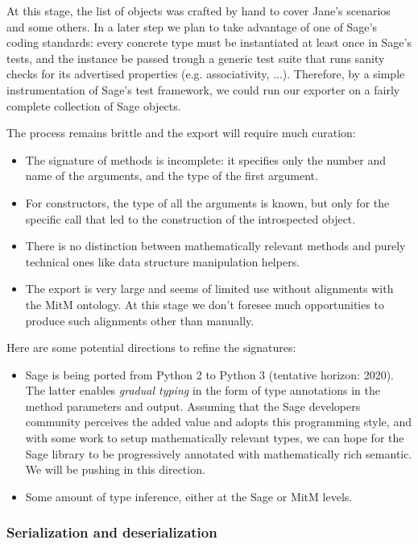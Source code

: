 At this stage, the list of objects was crafted by hand to cover Jane's
scenarios and some others. In a later step we plan to take advantage
of one of Sage's coding standards: every concrete type must be
instantiated at least once in Sage's tests, and the instance be passed
trough a generic test suite that runs sanity checks for its advertised
properties (e.g. associativity, ...). Therefore, by a simple
instrumentation of Sage's test framework, we could run our exporter on
a fairly complete collection of Sage objects.

The process remains brittle and the export will require much curation:
\begin{itemize}
\item The signature of methods is incomplete: it specifies only the
  number and name of the arguments, and the type of the first
  argument.
\item For constructors, the type of all the arguments is known, but
  only for the specific call that led to the construction of the
  introspected object.
\item There is no distinction between mathematically relevant methods
  and purely technical ones like data structure manipulation helpers.
\item The export is very large and seems of limited use without
  alignments with the MitM ontology. At this stage we don't foresee
  much opportunities to produce such alignments other than manually.
\end{itemize}

Here are some potential directions to refine the signatures:
\begin{itemize}
\item Sage is being ported from Python 2 to Python 3 (tentative
  horizon: 2020). The latter enables \emph{gradual typing} in the form
  of type annotations in the method parameters and output. Assuming
  that the Sage developers community perceives the added value and
  adopts this programming style, and with some work to setup
  mathematically relevant types, we can hope for the Sage library to
  be progressively annotated with mathematically rich semantic. We
  will be pushing in this direction.
\item Some amount of type inference, either at the Sage or MitM levels.
\end{itemize}

\subsubsection{Serialization and deserialization}

